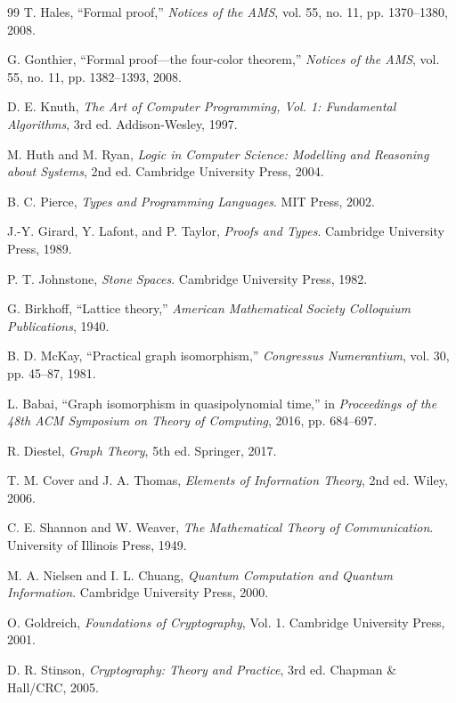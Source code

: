 \begin{thebibliography}{99}
 T. Hales, ``Formal proof,'' \emph{Notices of the AMS}, vol. 55, no. 11, pp. 1370--1380, 2008.

 G. Gonthier, ``Formal proof---the four-color theorem,'' \emph{Notices of the AMS}, vol. 55, no. 11, pp. 1382--1393, 2008.

 D. E. Knuth, \emph{The Art of Computer Programming, Vol. 1: Fundamental Algorithms}, 3rd ed. Addison-Wesley, 1997.

 M. Huth and M. Ryan, \emph{Logic in Computer Science: Modelling and Reasoning about Systems}, 2nd ed. Cambridge University Press, 2004.

 B. C. Pierce, \emph{Types and Programming Languages}. MIT Press, 2002.

 J.-Y. Girard, Y. Lafont, and P. Taylor, \emph{Proofs and Types}. Cambridge University Press, 1989.

 P. T. Johnstone, \emph{Stone Spaces}. Cambridge University Press, 1982.

 G. Birkhoff, ``Lattice theory,'' \emph{American Mathematical Society Colloquium Publications}, 1940.

 B. D. McKay, ``Practical graph isomorphism,'' \emph{Congressus Numerantium}, vol. 30, pp. 45--87, 1981.

 L. Babai, ``Graph isomorphism in quasipolynomial time,'' in \emph{Proceedings of the 48th ACM Symposium on Theory of Computing}, 2016, pp. 684--697.

 R. Diestel, \emph{Graph Theory}, 5th ed. Springer, 2017.

 T. M. Cover and J. A. Thomas, \emph{Elements of Information Theory}, 2nd ed. Wiley, 2006.

 C. E. Shannon and W. Weaver, \emph{The Mathematical Theory of Communication}. University of Illinois Press, 1949.

 M. A. Nielsen and I. L. Chuang, \emph{Quantum Computation and Quantum Information}. Cambridge University Press, 2000.

 O. Goldreich, \emph{Foundations of Cryptography}, Vol. 1. Cambridge University Press, 2001.

 D. R. Stinson, \emph{Cryptography: Theory and Practice}, 3rd ed. Chapman \& Hall/CRC, 2005.


\end{thebibliography}
